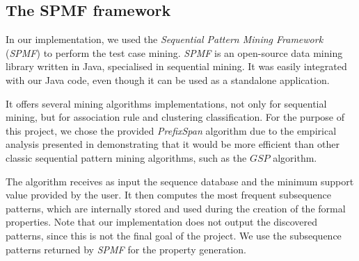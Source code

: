 \subsection{The SPMF framework}
\label{sec-spmf}

In our implementation, we used the \textit{Sequential Pattern Mining Framework} (\textit{SPMF})\cite{spmf} to perform the test case mining. \textit{SPMF} is an open-source data mining library written in Java, specialised in sequential mining. It was easily integrated with our Java code, even though it can be used as a standalone application.

It offers several mining algorithms implementations, not only for sequential mining, but for association rule and clustering classification. For the purpose of this project, we chose the provided \textit{PrefixSpan} algorithm due to the empirical analysis presented in \cite{Pei} demonstrating that it would be more efficient than other classic sequential pattern mining algorithms, such as the $GSP$ algorithm.

The algorithm receives as input the sequence database and the minimum support value provided by the user. It then computes the most frequent subsequence patterns, which are internally stored and used during the creation of the formal properties. Note that our implementation does not output the discovered patterns, since this is not the final goal of the project. We use the subsequence patterns returned by \textit{SPMF} for the property generation. 


